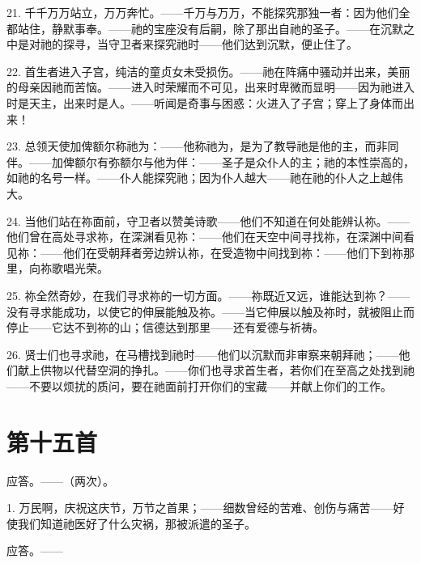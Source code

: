 21. 千千万万站立，万万奔忙。——千万与万万，不能探究那独一者：因为他们全都站住，静默事奉。——祂的宝座没有后嗣，除了那出自祂的圣子。——在沉默之中是对祂的探寻，当守卫者来探究祂时——他们达到沉默，便止住了。\par

22. 首生者进入子宫，纯洁的童贞女未受损伤。——祂在阵痛中骚动并出来，美丽的母亲因祂而苦恼。——进入时荣耀而不可见，出来时卑微而显明——因为祂进入时是天主，出来时是人。——听闻是奇事与困惑：火进入了子宫；穿上了身体而出来！\par

23. 总领天使加俾额尔称祂为：——他称祂为，是为了教导祂是他的主，而非同伴。——加俾额尔有弥额尔与他为伴：——圣子是众仆人的主；祂的本性崇高的，如祂的名号一样。——仆人能探究祂；因为仆人越大——祂在祂的仆人之上越伟大。\par

24. 当他们站在祢面前，守卫者以赞美诗歌——他们不知道在何处能辨认祢。——他们曾在高处寻求祢，在深渊看见祢：——他们在天空中间寻找祢，在深渊中间看见祢：——他们在受朝拜者旁边辨认祢，在受造物中间找到祢：——他们下到祢那里，向祢歌唱光荣。\par

25. 祢全然奇妙，在我们寻求祢的一切方面。——祢既近又远，谁能达到祢？——没有寻求能成功，以使它的伸展能触及祢。——当它伸展以触及祢时，就被阻止而停止——它达不到祢的山；信德达到那里——还有爱德与祈祷。\par

26. 贤士们也寻求祂，在马槽找到祂时——他们以沉默而非审察来朝拜祂；——他们献上供物以代替空洞的挣扎。——你们也寻求首生者，若你们在至高之处找到祂——不要以烦扰的质问，要在祂面前打开你们的宝藏——并献上你们的工作。\par


\section{第十五首}

应答。——（两次）。\par

1. 万民啊，庆祝这庆节，万节之首果；——细数曾经的苦难、创伤与痛苦——好使我们知道祂医好了什么灾祸，那被派遣的圣子。\par

应答。——\par

